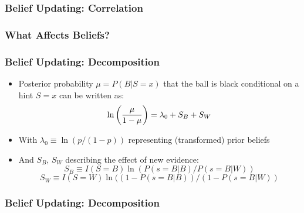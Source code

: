 \documentclass[11pt,hyperref={bookmarks=false}]{beamer}
\begin{document}
\begin{frame}
\frametitle{Belief Updating: Correlation}
\footnotesize


\end{frame}

\begin{frame}
\frametitle{What Affects Beliefs?}
\footnotesize

\end{frame}

\begin{frame}
\frametitle{Belief Updating: Decomposition}
\begin{itemize}
\item Posterior probability $\mu=P(B|S=x)$ that the ball is black conditional on a hint $S=x$ can be written as:
$$\ln \left({\mu \over 1-\mu} \right)=\lambda_0+S_B+S_W$$
\item With $\lambda_0\equiv \ln(p/(1-p))$ representing (transformed) prior beliefs
\item And $S_B$, $S_W$ describing the effect of new evidence:
$$S_B\equiv I(S=B)\ln(P(s=B|B)/P(s=B|W))$$
$$S_W\equiv I(S=W)\ln((1-P(s=B|B))/(1-P(s=B|W))$$
\end{itemize}
\end{frame}


\begin{frame}
\frametitle{Belief Updating: Decomposition}
\footnotesize

\end{frame}
\end{document}
